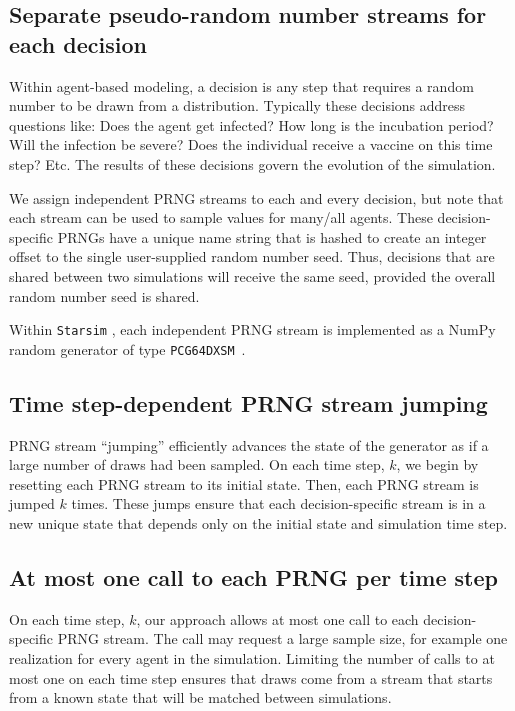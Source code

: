 \documentclass[10pt,letterpaper]{article}
\newcommand{\starsim}{\texttt{Starsim} }
\begin{document}
\subsection*{Separate pseudo-random number streams for each decision}

Within agent-based modeling, a decision is any step that requires a random number to be drawn from a distribution. Typically these decisions address questions like: Does the agent get infected? How long is the incubation period? Will the infection be severe? Does the individual receive a vaccine on this time step? Etc. The results of these decisions govern the evolution of the simulation.

We assign independent PRNG streams to each and every decision, but note that each stream can be used to sample values for many/all agents. These decision-specific PRNGs have a unique name string that is hashed to create an integer offset to the single user-supplied random number seed. Thus, decisions that are shared between two simulations will receive the same seed, provided the overall random number seed is shared.

Within \starsim, each independent PRNG stream is implemented as a NumPy random generator of type \texttt{PCG64DXSM}~\cite{pcg}.


\subsection*{Time step-dependent PRNG stream jumping}

PRNG stream ``jumping'' efficiently advances the state of the generator as if a large number of draws had been sampled. On each time step, $k$, we begin by resetting each PRNG stream to its initial state. Then, each PRNG stream is jumped $k$ times. These jumps ensure that each decision-specific stream is in a new unique state that depends only on the initial state and simulation time step.

\subsection*{At most one call to each PRNG per time step}

On each time step, $k$, our approach allows at most one call to each decision-specific PRNG stream. The call may request a large sample size, for example one realization for every agent in the simulation. Limiting the number of calls to at most one on each time step ensures that draws come from a stream that starts from a known state that will be matched between simulations.
\end{document}
